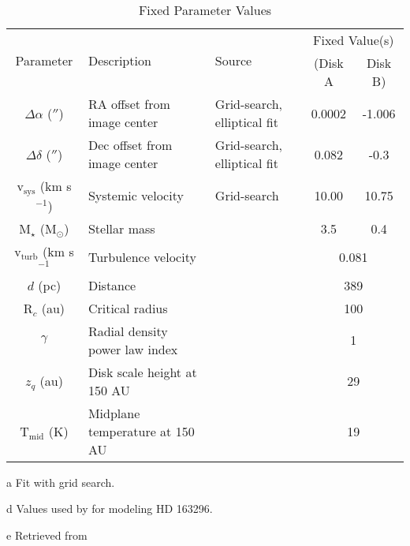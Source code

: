 \begin{table}
  \begin{threeparttable}
    \centering
    \caption{Fixed Parameter Values}
    \label{table:fixed_params}
    \renewcommand{\arraystretch}{1.2}
    \begin{tabular}{c  l  l  c  c }
      \toprule \toprule
      \multirow{2}{*}{Parameter} & \multirow{2}{*}{Description} & \multirow{2}{*}{Source} & \multicolumn{2}{c}{Fixed Value(s)} \\
                                 &                              &                         & (Disk A & Disk B) \\
      \midrule %
      $\Delta \alpha$ ($''$)       &  RA offset from image center     & Grid-search, elliptical fit & 0.0002 & -1.006  \\
      $\Delta \delta$ ($''$)       &  Dec offset from image center    & Grid-search, elliptical fit & 0.082  & -0.3 \\
      v$_\text{sys}$ (km s$^{-1}$) &  Systemic velocity               & Grid-search            & 10.00  & 10.75      \\
      M$_\star$ (M$_\odot$)        &  Stellar mass                    & \cite{Williams2014}    & 3.5    & 0.4   \\
      v$_\text{turb}$ (km s$^{-1}$ &  Turbulence velocity             & \cite{Flaherty2015}    & \multicolumn{2}{c}{0.081}   \\
      $d$ (pc)                     &  Distance                        & \cite{GaiaCollaboration2018} & \multicolumn{2}{c}{389}   \\
      R$_c$ (au)                   &  Critical radius                 & \cite{Williams2014}    & \multicolumn{2}{c}{100}\\
      $\gamma$                     &  Radial density power law index} & \cite{Andrews2009}    &  \multicolumn{2}{c}{1}\\
      $z_q$ (au)                   &  Disk scale height at 150 AU     & \cite{Factor2017}          & \multicolumn{2}{c}{29}\\
      T$_\text{mid}$ (K)           &  Midplane temperature at 150 AU  & \cite{Qi2011}          & \multicolumn{2}{c}{19}\\
      \bottomrule
    \end{tabular}

    \begin{tablenotes}\footnotesize
      \item[a] Fit with grid search.
      \item[d] Values used by \cite{Flaherty2015} for modeling HD 163296.
      \item[e] Retrieved from \cite{Williams2014}
    \end{tablenotes}
  \end{threeparttable}
\end{table}



